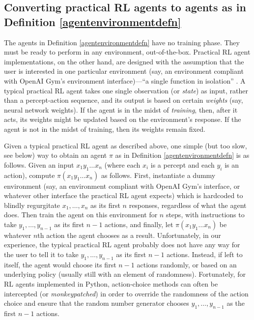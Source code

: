 \documentclass{article}
\begin{document}
\subsection{Converting practical RL agents to agents as in
Definition \ref{agentenvironmentdefn}}
\label{mappingtouniversalsection}

The agents in Definition \ref{agentenvironmentdefn} have no training phase. They must be
ready to perform in any environment, out-of-the-box. Practical RL agent implementations,
on the other hand, are designed with the assumption that the user is interested in one
particular environment (say, an environment compliant with OpenAI Gym's
environment interface)---``a single function in isolation'' \cite{thrun1998lifelong}.
A typical practical RL agent takes one single observation (or
\emph{state}) as input, rather than a percept-action sequence, and its output is based
on certain \emph{weights} (say, neural network weights). If the agent is in the midst of
\emph{training}, then, after it acts, its weights might be updated based on the environment's
response. If the agent is not in the midst of training, then its weights remain fixed.

Given a typical practical RL agent as described above, one simple
(but too slow, see below)
way to obtain an agent
$\pi$ as in Definition \ref{agentenvironmentdefn} is as follows.
Given an input $x_1y_1\ldots x_n$ (where each $x_i$ is a percept and each $y_i$ is an
action), compute $\pi(x_1y_1\ldots x_n)$ as follows. First, instantiate a dummy
environment (say, an environment compliant with OpenAI Gym's interface, or whatever other
interface the practical RL agent expects) which is hardcoded to blindly regurgitate
$x_1,\ldots,x_n$ as its first $n$ responses, regardless of what the agent does.
Then train the agent on this environment for $n$ steps, with instructions to
take $y_1,\ldots,y_{n-1}$ as its first $n-1$ actions, and finally, let
$\pi(x_1y_1\ldots x_n)$ be whatever $n$th action the agent chooses as a result.
Unfortunately, in our experience, the typical practical RL agent probably does not have
any way for the user to tell it to take $y_1,\ldots,y_{n-1}$ as its first $n-1$
actions. Instead, if left to itself, the agent would choose its first $n-1$ actions
randomly, or based on an underlying policy (usually still with an element of randomness).
Fortunately, for RL agents implemented in Python,
action-choice methods can often be intercepted (or \emph{monkeypatched})
in order to override the randomness of the action choice and ensure
that the random number generator chooses $y_1,\ldots,y_{n-1}$ as the first $n-1$
actions.
\end{document}
